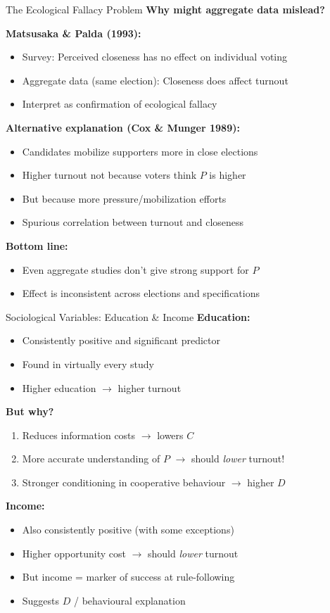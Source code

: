 \documentclass[10pt]{beamer}
\begin{document}
\begin{frame}{The Ecological Fallacy Problem}
\textbf{Why might aggregate data mislead?}


\textbf{Matsusaka \& Palda (1993):}
\begin{itemize}
\item Survey: Perceived closeness has \alert{no} effect on individual voting
\item Aggregate data (same election): Closeness \alert{does} affect turnout
\item Interpret as confirmation of ecological fallacy
\end{itemize}


\textbf{Alternative explanation (Cox \& Munger 1989):}
\begin{itemize}
\item Candidates mobilize supporters more in close elections
\item Higher turnout not because voters think $P$ is higher
\item But because more pressure/mobilization efforts
\item Spurious correlation between turnout and closeness
\end{itemize}


\textbf{Bottom line:}
\begin{itemize}
\item Even aggregate studies don't give strong support for $P$
\item Effect is inconsistent across elections and specifications
\end{itemize}
\end{frame}

\begin{frame}{Sociological Variables: Education \& Income}
\textbf{Education:}
\begin{itemize}
\item Consistently \alert{positive and significant} predictor
\item Found in virtually every study
\item Higher education $\rightarrow$ higher turnout
\end{itemize}


\textbf{But why?}
\begin{enumerate}
\item Reduces information costs $\rightarrow$ lowers $C$
\item More accurate understanding of $P$ $\rightarrow$ should \emph{lower} turnout!
\item Stronger conditioning in cooperative behaviour $\rightarrow$ higher $D$
\end{enumerate}


\textbf{Income:}
\begin{itemize}
\item Also consistently positive (with some exceptions)
\item Higher opportunity cost $\rightarrow$ should \emph{lower} turnout
\item But income = marker of success at rule-following
\item Suggests $D$ / behavioural explanation
\end{itemize}
\end{frame}
\end{document}
